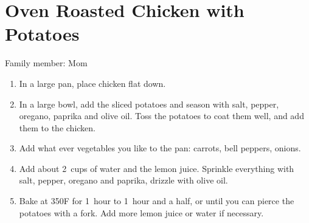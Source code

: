 \chapter{Oven Roasted Chicken with Potatoes}
\label{ch:chickenandpotatoes}


Family member: Mom

\begin{enumerate}
    \item In a large pan, place chicken flat down.
    \item In a large bowl, add the sliced potatoes and season with salt, pepper, oregano, paprika and olive oil. Toss the potatoes to coat them well, and add them to the chicken.
    \item Add what ever vegetables you like to the pan: carrots, bell peppers, onions.
    \item Add about 2~cups of water and the lemon juice. Sprinkle everything with salt, pepper, oregano and paprika, drizzle with olive oil.
    \item Bake at 350\degree F for 1~hour to 1~hour and a half, or until you can pierce the potatoes with a fork. Add more lemon juice or water if necessary.
\end{enumerate}
